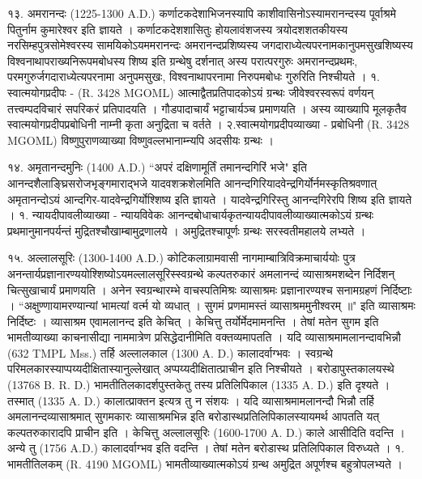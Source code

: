 १३. अमरानन्दः (1225-1300 A.D.)
कर्णाटकदेशाभिजनस्यापि काशीवासिनोऽस्यामरानन्दस्य पूर्वाश्रमे पितुर्नाम कुमारेश्वर इति ज्ञायते । कर्णाटकदेशशासितुः होयलावंशजस्य त्रयोदशशतकीयस्य नरसिम्हपुत्रसोमेश्वरस्य सामयिकोऽयममरानन्दः अमरानन्दप्रशिष्यस्य जगदाराध्येत्यपरनामकानुपमसुखशिष्यस्य विश्वनाथापराख्यनिरूपमबोधस्य शिष्य इति ग्रन्थेषु दर्शनात् अस्य परात्परगुरुः अमरानन्दप्रथमः, परमगुरुर्जगदाराध्येत्यपरनामा अनुपमसुखः, विश्वनाथापरनामा निरुपमबोधः गुरुरिति निश्चीयते ।
१. स्वात्मयोगप्रदीपः - (R. 3428 MGOML)
आत्माद्वैतप्रतिपादकोऽयं ग्रन्थः जीवेश्वरस्वरूपं वर्णयन् तत्त्वम्पदविचारं सपरिकरं प्रतिपादयति । गौडपादाचार्यं भट्टाचार्यञ्च प्रमाणयति । अस्य व्याख्यापि मूलकृतैव स्वात्मयोगप्रदीपप्रबोधिनी नाम्नी कृता अनुद्रिता च वर्तते ।
२.स्वात्मयोगप्रदीपव्याख्या - प्रबोधिनी (R. 3428 MGOML) विष्णुपुराणव्याख्या विष्णुवल्लभानाम्न्यपि अदसीयः ग्रन्थः ।

१४. अमृतानन्दमुनिः (1400 A.D.)
``अपरं दक्षिणामूर्तिं तमानन्दगिरिं भजे" इति आनन्दशैलाङ्घ्रिसरोजभृङ्गमाराद्भजे यादवशक्रशेलमिति आनन्दगिरियादवेन्द्रगिर्योर्नमस्कृतिश्रवणात् अमृतानन्दोऽयं आन्दगिर-यादवेन्द्रगिर्योश्शिष्य इति ज्ञायते । यादवेन्द्रगिरिस्तु आनन्दगिरेरपि शिष्य इति ज्ञायते ।
१. न्यायदीपावलीव्याख्या - न्यायविवेकः
आनन्दबोधाचार्यकृतन्यायदीपावलीव्याख्यात्मकोऽयं ग्रन्थः प्रथमानुमानपर्यन्तं मुद्रितश्चौखाम्बामुद्रणालये । अमुद्रितश्चापूर्णः ग्रन्थः सरस्वतीमहालये लभ्यते ।

१५. अल्लालसूरिः (1300-1400 A.D.)
कोटिकलाग्रामवासी नागमाम्बात्रिविक्रमाचार्ययोः पुत्र अनन्तार्यप्रज्ञानारण्ययोश्शिष्योऽयमल्लालसूरिस्स्वग्रन्थे कल्पतरुकारं अमलानन्दं व्यासाश्रमशब्देन निर्दिशन् चित्सुखाचार्यं प्रमाणयति । अनेन स्वग्रन्थारम्भे वाचस्पतिमिश्रः व्यासाश्रमः प्रज्ञानारण्यश्च सनामग्रहणं निर्दिष्टाः ।
``अक्षुण्णायामरण्यान्यां भामत्यां वर्त्म यो व्यधात् ।
सुगमं प्रणमामस्तं व्यासाश्रममुनीश्वरम् ॥"
इति व्यासाश्रमः निर्दिष्टः । व्यासाश्रम एवामलानन्द इति केचित् । केचित्तु तर्योर्मेदमामनन्ति । तेषां मतेन सुगम इति भामतीव्याख्या काचनासीद्या नाममात्रेण प्रसिद्धेदानीमिति वक्तव्यमापतति ।
यदि व्यासाश्रमामलानन्दावभिन्नौ (632 TMPL Mss.) तर्हि अल्लालकाल (1300 A. D.) कालादर्वाग्भवः । स्वग्रन्थे परिमलकारस्याप्पय्यदीक्षितास्यानुल्लेखात् अप्पय्यदीक्षितात्प्राचीन इति निश्चीयते । बरोडापुस्तकालयस्थे (13768 B. R. D.) भामतीतिलकादर्शपुस्तकेतु तस्य प्रतिलिपिकाल (1335 A. D.) इति दृश्यते । तस्मात् (1335 A. D.) कालात्प्राक्तन इत्यत्र तु न संशयः । यदि व्यासाश्रमामलानन्दौ भिन्नौ तर्हि अमलानन्दव्यासाश्रमात् सुगमकारः व्यासाश्रमभिन्न इति बरोडास्थप्रतिलिपिकालस्यायमर्थ आपतति यत् कल्पतरुकारादपि प्राचीन इति । केचित्तु अल्लालसूरिः (1600-1700 A. D.) काले आसीदिति वदन्ति । अन्ये तु (1756 A.D.) कालादर्वाग्भव इति वदन्ति । तेषां मतेन बरोडास्थ प्रतिलिपिकाल विरुध्यते ।
१. भामतीतिलकम् (R. 4190 MGOML)
भामतीव्याख्यात्मकोऽयं ग्रन्थ अमुद्रित अपूर्णश्च बहुत्रोपलभ्यते ।

